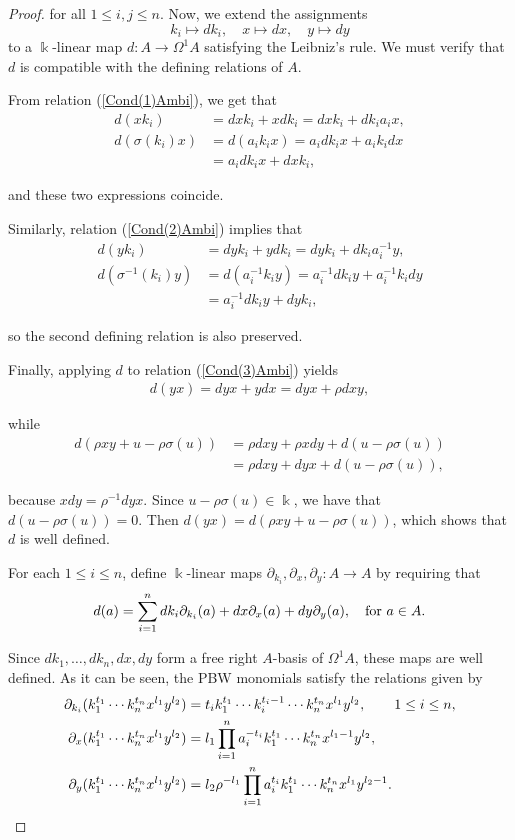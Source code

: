\documentclass{amsart}
\theoremstyle{definition}
\theoremstyle{remark}
\numberwithin{equation}{section}
\begin{document}
\begin{proof}
for all $1\leq i,j\leq n$. Now, we extend the assignments
\[
k_i\mapsto dk_i,\quad x\mapsto dx,\quad y\mapsto dy
\]
to a $\Bbbk$-linear map $d:A\to \Omega^1A$ satisfying the Leibniz's rule. We must verify that $d$ is compatible with the defining relations of $A$.

From relation {\rm(}\ref{Cond(1)Ambi}{\rm)}, we get that
\begin{align*}
d(xk_i) &= dx k_i+x dk_i = dx k_i+dk_i a_i x, \\
d(\sigma(k_i)x) &= d(a_i k_i x) = a_i dk_i x+a_i k_i dx \\
   &= a_i dk_i x+dx k_i,
\end{align*}

and these two expressions coincide.

Similarly, relation {\rm(}\ref{Cond(2)Ambi}{\rm)} implies that
\begin{align*}
d(yk_i) &= dy k_i+y dk_i = dy k_i+dk_i a_i^{-1}y, \\
d(\sigma^{-1}(k_i)y) &= d(a_i^{-1}k_i y) = a_i^{-1}dk_i y+a_i^{-1}k_i dy \\
   &= a_i^{-1}dk_i y+dy k_i,
\end{align*}

so the second defining relation is also preserved.

Finally, applying $d$ to relation {\rm(}\ref{Cond(3)Ambi}{\rm)} yields
\begin{align*}
d(yx) = dy x+y dx = dy x+\rho dx y,
\end{align*}

while
\begin{align*}
d(\rho xy+u-\rho\sigma(u)) &= \rho dx y+\rho x dy+d(u-\rho\sigma(u)) \\
   &= \rho dx y+dy x+d(u-\rho\sigma(u)),
\end{align*}

because $x dy=\rho^{-1}dy x$. Since $u-\rho\sigma(u)\in \Bbbk$, we have that $d(u-\rho\sigma(u))=0$. Then $d(yx) = d(\rho xy+u-\rho\sigma(u))$, which shows that $d$ is well defined.

For each $1\leq i\leq n$, define $\Bbbk$-linear maps $\partial_{k_i},\partial_x,\partial_y:A\to A$ by requiring that
\[
d(a)=\sum_{i=1}^n dk_i \partial_{k_i}(a)+dx \partial_x(a)+dy \partial_y(a), \quad {\rm for} \  a\in A.
\]

Since $dk_1,\ldots,dk_n,dx,dy$ form a free right $A$-basis of $\Omega^1A$, these maps are well defined. As it can be seen, the PBW monomials  satisfy the relations given by
\begin{align}
\partial_{k_i}(k_1^{t_1}\cdots k_n^{t_n}x^{l_1}y^{l_2}) &= t_i k_1^{t_1}\cdots k_i^{t_i-1}\cdots k_n^{t_n}x^{l_1}y^{l_2}, \qquad 1\leq i\leq n, \notag \\
\partial_x(k_1^{t_1}\cdots k_n^{t_n}x^{l_1}y^{l_2}) &= l_1\prod_{i=1}^n a_i^{-t_i} k_1^{t_1}\cdots k_n^{t_n}x^{l_1-1}y^{l_2}, \label{partial_formulae} \\
\partial_y(k_1^{t_1}\cdots k_n^{t_n}x^{l_1}y^{l_2}) &= l_2 \rho^{-l_1}\prod_{i=1}^n a_i^{t_i} k_1^{t_1}\cdots k_n^{t_n}x^{l_1}y^{l_2-1}. \notag
\end{align}


\end{proof}
\end{document}
